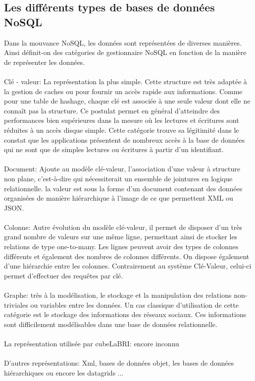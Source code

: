 \subsection{Les différents types de bases de données \textsf{NoSQL}} 
 
Dans la mouvance \textsf{NoSQL}, les données sont représentées de
diverses manières. Ainsi définit-on des catégories de gestionnaire
\textsf{NoSQL} en fonction de la manière de représenter les données.
\\\\ \textsf{Clé - valeur}: La
représentation la plus simple. Cette structure est très adaptée à la
gestion de caches ou pour fournir un accès rapide aux
informations. Comme pour une table de hashage, chaque clé est associée
à une seule valeur dont elle ne connaît pas la structure. Ce postulat
permet en général d’atteindre des performances bien supérieures dans
la mesure où les lectures et écritures sont réduites à un accès disque
simple. Cette catégorie trouve sa légitimité dans le constat que les
applications présentent de nombreux accès à la base de données qui ne
sont que de simples lectures ou écritures à partir d’un
identifiant\cite{cleValeur}.  \\\\ {\sf Document}:
Ajoute au modèle clé-valeur,
l’association d’une valeur à structure non plane, c’est-à-dire qui
nécessiterait un ensemble de jointures en logique relationnelle.  la
valeur est sous la forme d'un document contenant des données
organisées de manière hiérarchique à l’image de ce que permettent
\textsf{XML} ou \textsf{JSON}.  \\\\ {\sf Colonne}: Autre évolution du modèle clé-valeur, il permet de
disposer d'un très grand nombre de valeurs sur une même ligne,
permettant ainsi de stocker les relations de type one-to-many. Les
lignes peuvent avoir des types de colonnes différents et également des
nombres de colonnes différents. On dispose également d'une hiérarchie
entre les colonnes. Contrairement au système Clé-Valeur, celui-ci
permet d’effectuer des requêtes par clé.  \\\\ {\sf
  Graphe}: très à la modélisation, le
stockage et la manipulation des relations non-triviales ou variables
entre les données. Un cas classique d'utilisation de cette catégorie
est le stockage des informations des réseaux sociaux. Ces informations
sont difficilement modélisables dans une base de données
relationnelle.  \\ \\ {\color{red} {\sf La représentation utilisée par
    cubeLaBRI}: encore inconnu} \\ \\ \textsf{D'autres
  représentations}: \textsf{Xml}, \textsf{bases de données objet},
\textsf{les bases de données hiérarchiques ou encore les datagrids}
...

